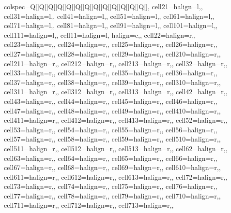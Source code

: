 \begin{table}
\centering
\begin{talltblr}[         %
caption={Descriptive statistics for all data files},
note{}={LS: LaLonde Sample, C: control, T: treatment},
]                     %
{                     %
colspec={Q[]Q[]Q[]Q[]Q[]Q[]Q[]Q[]Q[]Q[]Q[]Q[]Q[]},
cell{2}{1}={}{halign=l,},
cell{3}{1}={}{halign=l,},
cell{4}{1}={}{halign=l,},
cell{5}{1}={}{halign=l,},
cell{6}{1}={}{halign=l,},
cell{7}{1}={}{halign=l,},
cell{8}{1}={}{halign=l,},
cell{9}{1}={}{halign=l,},
cell{10}{1}={}{halign=l,},
cell{11}{1}={}{halign=l,},
cell{1}{1}={}{halign=l, halign=c,},
cell{2}{2}={}{halign=r,},
cell{2}{3}={}{halign=r,},
cell{2}{4}={}{halign=r,},
cell{2}{5}={}{halign=r,},
cell{2}{6}={}{halign=r,},
cell{2}{7}={}{halign=r,},
cell{2}{8}={}{halign=r,},
cell{2}{9}={}{halign=r,},
cell{2}{10}={}{halign=r,},
cell{2}{11}={}{halign=r,},
cell{2}{12}={}{halign=r,},
cell{2}{13}={}{halign=r,},
cell{3}{2}={}{halign=r,},
cell{3}{3}={}{halign=r,},
cell{3}{4}={}{halign=r,},
cell{3}{5}={}{halign=r,},
cell{3}{6}={}{halign=r,},
cell{3}{7}={}{halign=r,},
cell{3}{8}={}{halign=r,},
cell{3}{9}={}{halign=r,},
cell{3}{10}={}{halign=r,},
cell{3}{11}={}{halign=r,},
cell{3}{12}={}{halign=r,},
cell{3}{13}={}{halign=r,},
cell{4}{2}={}{halign=r,},
cell{4}{3}={}{halign=r,},
cell{4}{4}={}{halign=r,},
cell{4}{5}={}{halign=r,},
cell{4}{6}={}{halign=r,},
cell{4}{7}={}{halign=r,},
cell{4}{8}={}{halign=r,},
cell{4}{9}={}{halign=r,},
cell{4}{10}={}{halign=r,},
cell{4}{11}={}{halign=r,},
cell{4}{12}={}{halign=r,},
cell{4}{13}={}{halign=r,},
cell{5}{2}={}{halign=r,},
cell{5}{3}={}{halign=r,},
cell{5}{4}={}{halign=r,},
cell{5}{5}={}{halign=r,},
cell{5}{6}={}{halign=r,},
cell{5}{7}={}{halign=r,},
cell{5}{8}={}{halign=r,},
cell{5}{9}={}{halign=r,},
cell{5}{10}={}{halign=r,},
cell{5}{11}={}{halign=r,},
cell{5}{12}={}{halign=r,},
cell{5}{13}={}{halign=r,},
cell{6}{2}={}{halign=r,},
cell{6}{3}={}{halign=r,},
cell{6}{4}={}{halign=r,},
cell{6}{5}={}{halign=r,},
cell{6}{6}={}{halign=r,},
cell{6}{7}={}{halign=r,},
cell{6}{8}={}{halign=r,},
cell{6}{9}={}{halign=r,},
cell{6}{10}={}{halign=r,},
cell{6}{11}={}{halign=r,},
cell{6}{12}={}{halign=r,},
cell{6}{13}={}{halign=r,},
cell{7}{2}={}{halign=r,},
cell{7}{3}={}{halign=r,},
cell{7}{4}={}{halign=r,},
cell{7}{5}={}{halign=r,},
cell{7}{6}={}{halign=r,},
cell{7}{7}={}{halign=r,},
cell{7}{8}={}{halign=r,},
cell{7}{9}={}{halign=r,},
cell{7}{10}={}{halign=r,},
cell{7}{11}={}{halign=r,},
cell{7}{12}={}{halign=r,},
cell{7}{13}={}{halign=r,},
}
\end{talltblr}
\end{table}
